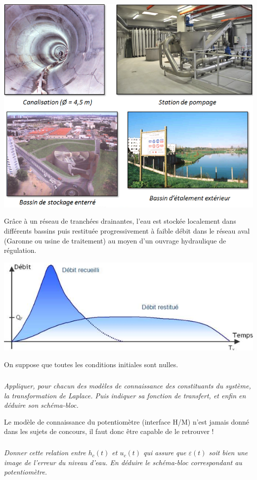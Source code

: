 \documentclass[10pt,fleqn]{article} %
\begin{document}
\begin{multicols}{2}
\begin{center}
\includegraphics[width=.48\textwidth]{images/img2}
\end{center}




Grâce à un réseau de tranchées drainantes, l’eau est stockée localement dans différents bassins puis restituée progressivement à faible débit dans le réseau aval (Garonne ou usine de traitement) au moyen d’un ouvrage hydraulique de régulation.  


\begin{center}
\includegraphics[width=.47\textwidth]{images/img3}
\end{center}





On suppose que toutes les conditions initiales sont nulles.

\subparagraph{}
\textit{Appliquer, pour chacun des modèles de connaissance des constituants du système, la
transformation de Laplace. Puis indiquer sa fonction de transfert, et enfin en déduire son
schéma-bloc.}
\ifprof
\begin{corrige}
\end{corrige}
\else
\fi




Le modèle de connaissance du potentiomètre (interface H/M) n'est jamais donné dans les sujets de
concours, il faut donc être capable de le retrouver !

\subparagraph{}
\textit{Donner cette relation entre $h_c (t)$ et $u_c (t)$ qui assure que $\varepsilon (t)$ soit bien une image de l’erreur
du niveau d’eau. En déduire le schéma-bloc correspondant au potentiomètre.}
\ifprof
\begin{corrige}
\end{corrige}
\else
\fi



\end{multicols}
\end{document}
